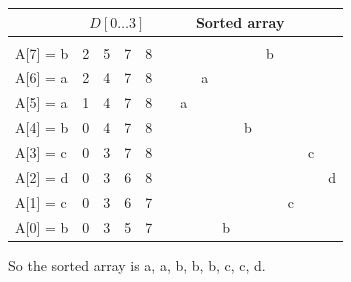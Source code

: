 \documentclass[letterpaper, 11pt]{article}
\begin{document}
\begin{center}
  \begin{tabular}{l | c c c c l | c | c | c | c | c | c | c | c |}
    & \multicolumn{4}{c}{\(D[0\dots 3]\)} & \multicolumn{8}{c}{Sorted array}\\
    \hline
    \\
    A[7] = b & 2 & 5 & 7 & 8 & &  &  &  &  & b &  &  &  \\
    A[6] = a & 2 & 4 & 7 & 8 & &  & a &  &  &  &  &  &  \\
    A[5] = a & 1 & 4 & 7 & 8 & & a &  &  &  &  &  &  &  \\
    A[4] = b & 0 & 4 & 7 & 8 & &  &  &  & b &  &  &  &  \\
    A[3] = c & 0 & 3 & 7 & 8 & &  &  &  &  &  &  & c &  \\
    A[2] = d & 0 & 3 & 6 & 8 & &  &  &  &  &  &  &  & d \\
    A[1] = c & 0 & 3 & 6 & 7 & &  &  &  &  &  & c &  &  \\
    A[0] = b & 0 & 3 & 5 & 7 & &  &  & b &  &  &  &  &  \\
  \end{tabular}
\end{center}

So the sorted array is a, a, b, b, b, c, c, d. 
\end{document}
